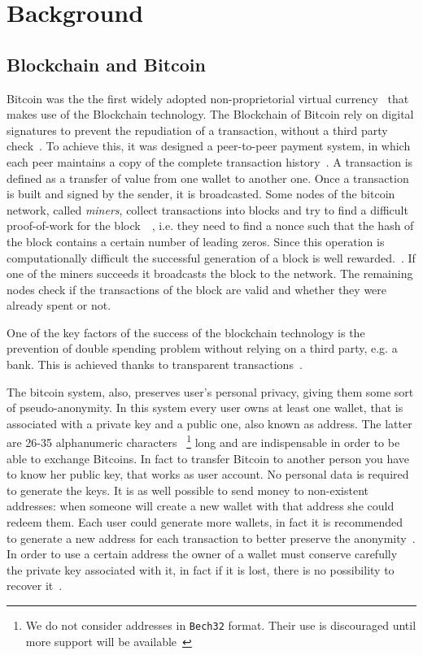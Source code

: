 \section{Background} \label{background}
\subsection{Blockchain and Bitcoin}
Bitcoin was the the first widely adopted non-proprietorial virtual
currency~\cite{bib:respCrypto} that makes use of the
Blockchain technology. The Blockchain of Bitcoin rely on digital
signatures to prevent the repudiation of a transaction, without a third
party check~\cite{bib:anonAnalysis}.
To achieve this, it was designed a peer-to-peer payment system,
in which each peer maintains a copy of the complete transaction
history~\cite{bib:fistful}. 
A transaction is defined as a transfer of value
from one wallet to another one. Once a transaction is built and signed by the
sender, it is broadcasted. Some nodes of the bitcoin network, called
\textit{miners}, collect transactions into blocks and try to find a difficult
proof-of-work for the block~\cite{bib:pricing}~\cite{bib:hashcash}, i.e. they
need to find a nonce such that the hash of the block contains a certain number
of leading zeros. Since this operation is
computationally difficult the successful generation of a block is well
rewarded.~\cite{bib:satoshi}. If one of the miners succeeds it broadcasts the block to the
network. The remaining nodes check if the transactions of the block are valid
and whether they were already spent or not. 

One of the key factors of the success of the blockchain technology
is the prevention of double spending problem without relying on a third party,
e.g. a bank. This is achieved thanks to transparent transactions~\cite{bib:bitcoinbeyond}.

The bitcoin system, also, preserves user's personal privacy, giving them some
sort of pseudo-anonymity. In this system every user owns at least one wallet,
that is associated with a private key and a public one, also known as address.
The latter are 26-35 alphanumeric characters~\cite{bib:bitcoinwiki:address}
\footnote{We do not consider addresses in \texttt{Bech32} format. Their use is
discouraged until more support will be available~\cite{bib:bitcoinwiki:bech32}}
long and are indispensable in order to be able to exchange Bitcoins.
In fact to transfer Bitcoin to another person you have to know her
public key, that works as user account. No personal data is required to generate
the keys. It is as well possible to send money to non-existent addresses: when
someone will create a new wallet with that address she could redeem
them. Each user could generate more wallets, in fact it is recommended
to generate a new address for each transaction to better preserve the
anonymity~\cite{bib:satoshi}. In order to use a certain address the owner of
a wallet must conserve carefully the private key associated with it, in fact
if it is lost, there is no possibility to recover it~\cite{bib:respCrypto}.


